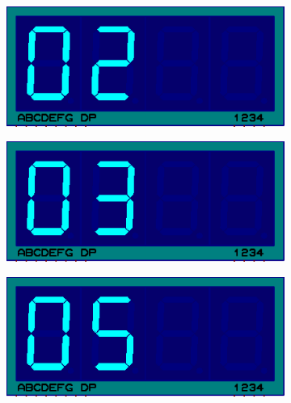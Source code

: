 \documentclass{lab_sheet}
\begin{document}
\begin{figure}[H]
\begin{subfigure}{.33\textwidth}
        \end{subfigure}
        \newline
        \begin{subfigure}{.33\textwidth}
          \centering
          \includegraphics[frame,width=.9\linewidth]{../Figures/f2}     
          \caption{}
          \label{fig:prob3-d}
        \end{subfigure}
        \begin{subfigure}{.33\textwidth}
          \centering
          \includegraphics[frame,width=.9\linewidth]{../Figures/f3}   
          \caption{}
          \label{fig:prob3-e}
        \end{subfigure}
        \begin{subfigure}{.33\textwidth}
          \centering
          \includegraphics[frame,width=.9\linewidth]{../Figures/f5}   
          \caption{}
          \label{fig:prob3-f}
        \end{subfigure}
        \newline

\end{figure}
\end{document}
